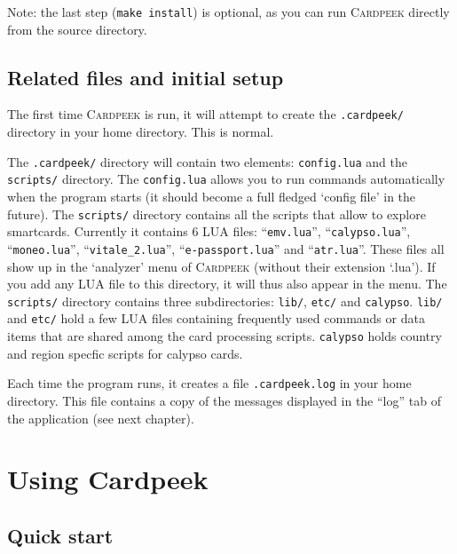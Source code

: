 \documentclass[11pt]{report}
\newcommand{\Cardpeek}{\textsc{Cardpeek}}
\begin{document}
Note: the last step (\texttt{make install}) is optional, as you can run \Cardpeek{} directly from the source directory.

\section{Related files and initial setup}
The first time \Cardpeek{} is run, it will attempt to create the
\texttt{.cardpeek/} directory in your home directory. This is normal.

The \texttt{.cardpeek/} directory will contain two elements: \texttt{config.lua} and the \texttt{scripts/} directory.
The \texttt{config.lua} allows you to run commands automatically when the program starts 
(it should become a full fledged `config file' in the future).
The \texttt{scripts/} directory contains all the scripts that allow to explore smartcards. 
Currently it contains 6 LUA files: ``\texttt{emv.lua}'', ``\texttt{calypso.lua}'', 
``\texttt{moneo.lua}'', ``\texttt{vitale\_2.lua}'', ``\texttt{e-passport.lua}'' and ``\texttt{atr.lua}''.
These files all show up in the `analyzer' menu of \Cardpeek{} (without their extension `.lua').
If you add any LUA file to this directory, it will thus also appear in the menu.
The \texttt{scripts/} directory contains three subdirectories: \texttt{lib/}, \texttt{etc/} and \texttt{calypso}. 
\texttt{lib/} and \texttt{etc/} hold a few LUA files containing frequently used commands or data items that are 
shared among the card processing scripts. 
\texttt{calypso} holds country and region specfic scripts for calypso cards.

Each time the program runs, it creates a file \texttt{.cardpeek.log} in your home directory.
This file contains a copy of the messages displayed in the ``log'' tab of the application (see next chapter). 

\chapter{Using Cardpeek}

\section{Quick start}
\end{document}
